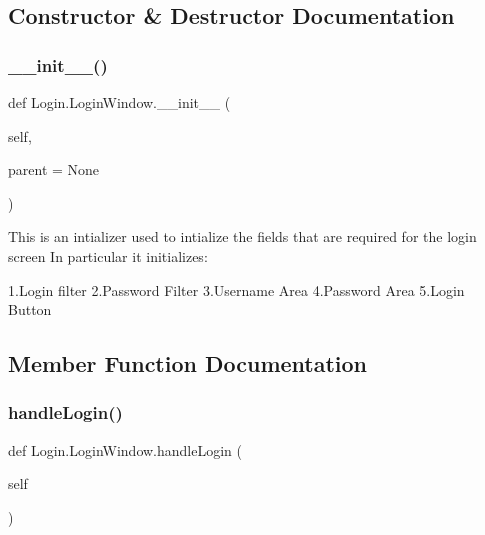 \subsection{Constructor \& Destructor Documentation}
\mbox{\label{classLogin_1_1LoginWindow_aef57c8863324399070faf514e2883e66}} 
\subsubsection{\texorpdfstring{\+\_\+\+\_\+init\+\_\+\+\_\+()}{\_\_init\_\_()}}
{\footnotesize\ttfamily def Login.\+Login\+Window.\+\_\+\+\_\+init\+\_\+\+\_\+ (\begin{DoxyParamCaption}\item[{}]{self,  }\item[{}]{parent = {\ttfamily None} }\end{DoxyParamCaption})}

\begin{DoxyVerb}This is an intializer used to  intialize the fields that are required for the login screen
In particular it initializes:

       1.Login filter
       2.Password Filter
       3.Username Area
       4.Password Area
       5.Login Button\end{DoxyVerb}
 

\subsection{Member Function Documentation}
\mbox{\label{classLogin_1_1LoginWindow_a391e97589387c5760c2d62f29b8ff1d3}} 
\subsubsection{\texorpdfstring{handle\+Login()}{handleLogin()}}
{\footnotesize\ttfamily def Login.\+Login\+Window.\+handle\+Login (\begin{DoxyParamCaption}\item[{}]{self }\end{DoxyParamCaption})}

